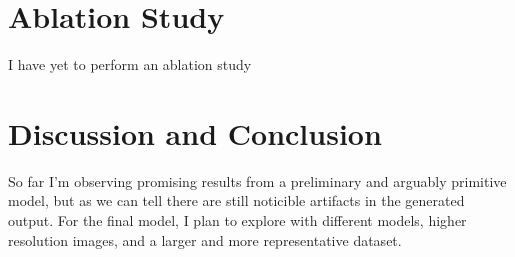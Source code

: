 \documentclass[twoside,11pt]{article}
\begin{document}
\section{Ablation Study}
\label{sec:ablation}
I have yet to perform an ablation study

\section{Discussion and Conclusion}
\label{sec:discussion}
So far I'm observing promising results from a preliminary and arguably primitive model, 
but as we can tell there are still noticible artifacts in the generated output.
For the final model, I plan to explore with different models, higher resolution images, 
and a larger and more representative dataset.

\newpage

\end{document}
